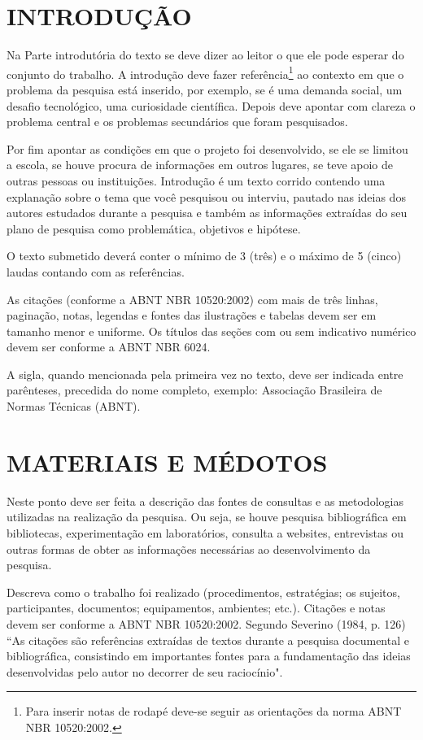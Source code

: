 \documentclass[12pt]{article}
\begin{document}
\section{\large INTRODUÇÃO}


Na Parte introdutória do texto se deve dizer ao leitor o que ele pode esperar do conjunto do trabalho. A introdução deve fazer referência\footnote{Para inserir notas de rodapé deve-se seguir as orientações da norma ABNT NBR 10520:2002.}  ao contexto em que o problema da pesquisa está inserido, por exemplo, se é uma demanda social, um desafio tecnológico, uma curiosidade científica. Depois deve apontar com clareza o problema central e os problemas secundários que foram pesquisados.

Por fim apontar as condições em que o projeto foi desenvolvido, se ele se limitou a escola, se houve procura de informações em outros lugares, se teve apoio de outras pessoas ou instituições. Introdução é um texto corrido contendo uma explanação sobre o tema que você pesquisou ou interviu, pautado nas ideias dos autores estudados durante a pesquisa e também as informações extraídas do seu plano de pesquisa como problemática, objetivos e hipótese. 

O texto submetido deverá conter o mínimo de 3 (três) e o máximo de 5 (cinco) laudas contando com as referências. 

As citações (conforme a ABNT NBR 10520:2002) com mais de três linhas, paginação, notas, legendas e fontes das ilustrações e tabelas devem ser em tamanho menor e uniforme. Os títulos das seções com ou sem indicativo numérico devem ser conforme a ABNT NBR 6024. 

A sigla, quando mencionada pela primeira vez no texto, deve ser indicada entre parênteses, precedida do nome completo, exemplo: Associação Brasileira de Normas Técnicas (ABNT).


\section{\large MATERIAIS E MÉDOTOS}

Neste ponto deve ser feita a descrição das fontes de consultas e as metodologias utilizadas na realização da pesquisa. Ou seja, se houve pesquisa bibliográfica em bibliotecas, experimentação em laboratórios, consulta a websites, entrevistas ou outras formas de obter as informações necessárias ao desenvolvimento da pesquisa.

Descreva como o trabalho foi realizado (procedimentos, estratégias; os sujeitos, participantes, documentos; equipamentos, ambientes; etc.).  Citações e notas devem ser conforme a ABNT NBR 10520:2002. Segundo Severino (1984, p. 126) ``As citações são referências extraídas de textos durante a pesquisa documental e bibliográfica, consistindo em importantes fontes para a fundamentação das ideias desenvolvidas pelo autor no decorrer de seu raciocínio".
\end{document}
